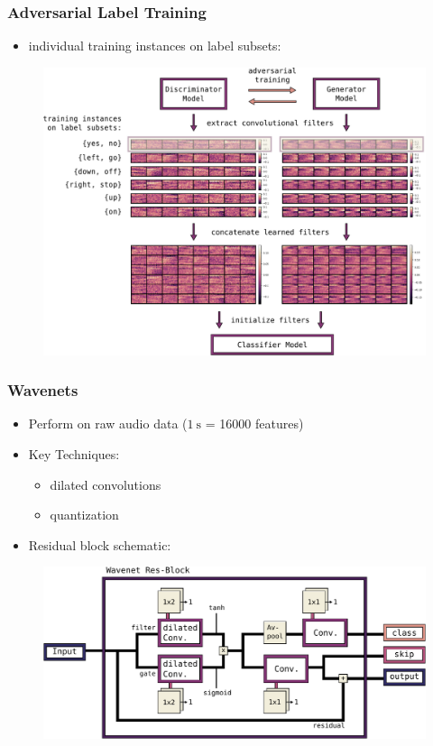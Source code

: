 \begin{frame}
  \frametitle{Adversarial Label Training}
  \begin{itemize}
    \item individual training instances on label subsets:
  \end{itemize}
  \begin{figure} \includegraphics[height=0.7\textheight]{../4_nn/figs/nn_adv_label_scheme.pdf} \end{figure}
\end{frame}


\begin{frame}
  \frametitle{Wavenets}
  \begin{itemize}
    \item Perform  on raw audio data ($\SI{1}{\second}$ = 16000 features)
    \item Key Techniques: 
    \begin{itemize}
      \item dilated convolutions
      \item quantization
    \end{itemize}
    \item Residual block schematic:
  \end{itemize}
  \vspace{-0.2cm}
  \begin{figure} \includegraphics[height=0.35\textheight]{../4_nn/figs/nn_arch_wavenet_block.pdf} \end{figure}
\end{frame}

